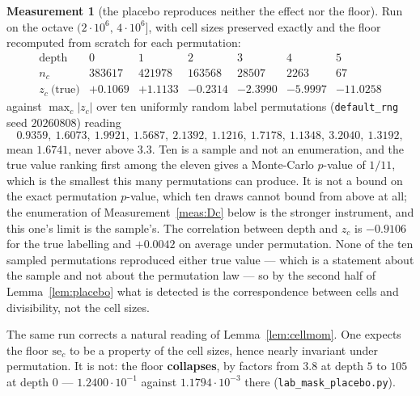 \documentclass[11pt,a4paper]{article}
\theoremstyle{plain}
\theoremstyle{definition}
\newtheorem{measurement}[theorem]{Measurement}
\theoremstyle{remark}
\begin{document}
\begin{measurement}[the placebo reproduces neither the effect nor the
floor]\label{meas:placebo}
Run on the octave $(2\cdot10^6,\,4\cdot10^6]$, with cell sizes
preserved exactly and the floor recomputed from scratch for each
permutation:
\[
\begin{array}{r|cccccc}
 \text{depth} & 0 & 1 & 2 & 3 & 4 & 5\\
 n_c & 383617 & 421978 & 163568 & 28507 & 2263 & 67\\\hline
 z_c\ \text{(true)} & +0.1069 & +1.1133 & -0.2314 & -2.3990
   & -5.9997 & -11.0258
\end{array}
\]
against $\max_c|z_c|$ over ten uniformly random label permutations
(\texttt{default\_rng} seed $20260808$) reading
\[
  0.9359,\ 1.6073,\ 1.9921,\ 1.5687,\ 2.1392,\
  1.1216,\ 1.7178,\ 1.1348,\ 3.2040,\ 1.3192,
\]
mean $1.6741$, never above $3.3$. Ten is a sample and not an
enumeration, and the true value ranking first among the eleven gives a
Monte-Carlo $p$-value of $1/11$, which is the smallest this many
permutations can produce. It is not a bound on the exact permutation
$p$-value, which ten draws cannot bound from above at all; the
enumeration of Measurement~\ref{meas:Dc} below is the
stronger instrument, and this one's limit is the sample's. The
correlation between depth and $z_c$ is $-0.9106$ for the true
labelling and $+0.0042$ on average under permutation. None of the ten
sampled permutations reproduced either true value --- which is a
statement about the sample and not about the permutation law --- so by
the second half of
Lemma~\ref{lem:placebo} what is detected is the correspondence between
cells and divisibility, not the cell sizes.

The same run corrects a natural reading of Lemma~\ref{lem:cellmom}.
One expects the floor $\mathrm{se}_c$ to be a property of the cell
sizes, hence nearly invariant under permutation. It is not: the floor
\textbf{collapses}, by factors from $3.8$ at depth $5$ to $105$ at
depth $0$ --- $1.2400\cdot10^{-1}$ against $1.1794\cdot10^{-3}$ there
(\texttt{lab\_mask\_placebo.py}).
\end{measurement}
\end{document}
